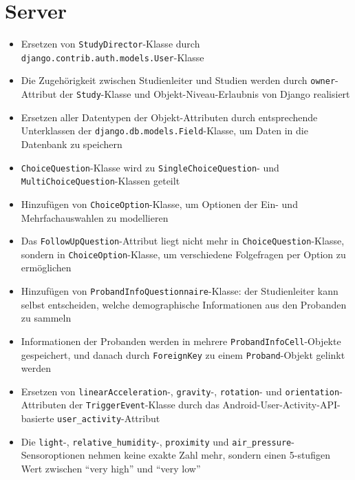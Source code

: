 \documentclass[a4paper]{scrreprt}
\begin{document}
        \section{Server}
            \begin{itemize}
                \item Ersetzen von \texttt{StudyDirector}-Klasse durch \texttt{django.contrib.auth.models.User}-Klasse

                \item Die Zugehörigkeit zwischen Studienleiter und Studien werden durch \texttt{owner}-Attribut der \texttt{Study}-Klasse und Objekt-Niveau-Erlaubnis von Django realisiert

                \item Ersetzen aller Datentypen der Objekt-Attributen durch entsprechende Unterklassen der \texttt{django.db.models.Field}-Klasse, um Daten in die Datenbank zu speichern

                \item \texttt{ChoiceQuestion}-Klasse wird zu \texttt{SingleChoiceQuestion}- und \texttt{MultiChoiceQuestion}-Klassen geteilt

                \item Hinzufügen von \texttt{ChoiceOption}-Klasse, um Optionen der Ein- und Mehrfachauswahlen zu modellieren

                \item Das \texttt{FollowUpQuestion}-Attribut liegt nicht mehr in \texttt{ChoiceQuestion}-Klasse, sondern in \texttt{ChoiceOption}-Klasse, um verschiedene Folgefragen per Option zu ermöglichen

                \item Hinzufügen von \texttt{ProbandInfoQuestionnaire}-Klasse: der Studienleiter kann selbst entscheiden, welche demographische Informationen aus den Probanden zu sammeln

                \item Informationen der Probanden werden in mehrere \texttt{ProbandInfoCell}-Objekte gespeichert, und danach durch \texttt{ForeignKey} zu einem \texttt{Proband}-Objekt gelinkt werden

                \item Ersetzen von \texttt{linearAcceleration}-, \texttt{gravity}-, \texttt{rotation}- und \texttt{orientation}-Attributen der \texttt{TriggerEvent}-Klasse durch das Android-User-Activity-API-basierte \texttt{user\_activity}-Attribut

                \item Die \texttt{light}-, \texttt{relative\_humidity}-, \texttt{proximity} und \texttt{air\_pressure}-Sensoroptionen nehmen keine exakte Zahl mehr, sondern einen 5-stufigen Wert zwischen “very high” und “very low”


            \end{itemize}
            
\end{document}
